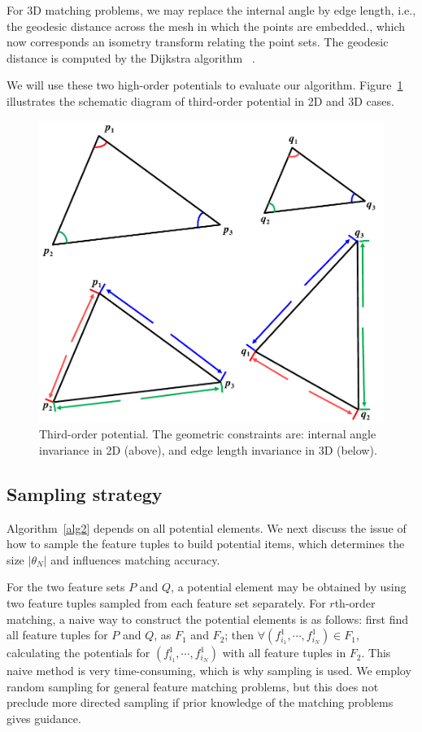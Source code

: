 For 3D matching problems, we may replace the internal angle by edge length, i.e., the geodesic distance across the mesh in which the points are embedded., which now corresponds
an isometry transform relating the point sets.
The geodesic distance is computed by the Dijkstra algorithm~\cite{Peyre2010} .

We will use these two high-order potentials to evaluate our algorithm.
Figure~\ref{fig:TO} illustrates the schematic diagram of third-order potential in 2D and 3D cases.

\begin{figure}
\centering
  \includegraphics[width=0.7\linewidth]{figures/diagram.pdf}
  \caption{Third-order potential. The geometric constraints are: internal angle invariance in 2D (above), and edge length invariance in 3D (below).}
\label{fig:TO}
\end{figure}

\subsection{Sampling strategy}
\label{subsec:sampling}

Algorithm~\ref{alg2} depends on all potential elements.
We next discuss the issue of how to sample the feature tuples to build potential items, which determines the size $|\theta_N|$ and influences matching accuracy.

For the two feature sets $P$ and $Q$,
a potential element may be obtained by using two feature tuples sampled from each feature set separately.
For $r$th-order matching, a naive way to construct the potential elements is as follows:
first find all feature tuples for $P$ and $Q$, as $F_1$ and $F_2$; then $\forall (f_{i_1}^1, \cdots, f_{i_N}^1)\in F_1$,
calculating the potentials for $(f_{i_1}^1, \cdots, f_{i_N}^1)$ with all feature tuples in $F_2$.
This naive method is very time-consuming, which is why sampling is used.
We employ random sampling for general feature matching problems,
but this does not preclude more directed sampling if prior knowledge of the matching problems gives guidance.


